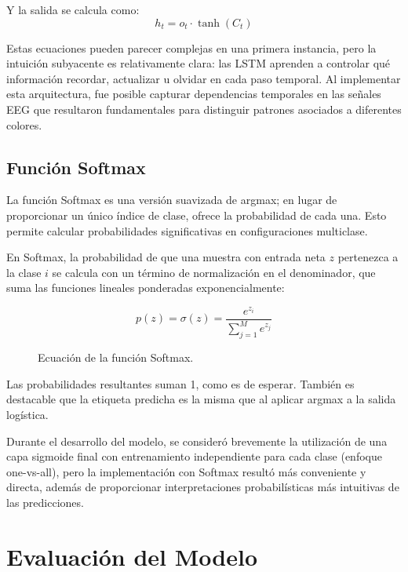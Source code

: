 Y la salida se calcula como:
\begin{equation}
    h_t = o_t \cdot \tanh(C_t)
\end{equation}

Estas ecuaciones pueden parecer complejas en una primera instancia, pero la intuición subyacente es relativamente clara: las LSTM aprenden a controlar qué información recordar, actualizar u olvidar en cada paso temporal. Al implementar esta arquitectura, fue posible capturar dependencias temporales en las señales EEG que resultaron fundamentales para distinguir patrones asociados a diferentes colores.

\subsection{Función Softmax}
La función Softmax es una versión suavizada de argmax; en lugar de proporcionar un único índice de clase, ofrece la probabilidad de cada una. Esto permite calcular probabilidades significativas en configuraciones multiclase.

En Softmax, la probabilidad de que una muestra con entrada neta $z$ pertenezca a la clase $i$ se calcula con un término de normalización en el denominador, que suma las funciones lineales ponderadas exponencialmente:

\begin{figure}[h!]
    \centering
    \begin{equation}
        p(z) = \sigma(z) = \frac{e^{z_i}}{\sum_{j=1}^M e^{z_j}}
    \end{equation}
    \caption{Ecuación de la función Softmax.}
    \label{fig:softmax_equation}
\end{figure}

Las probabilidades resultantes suman 1, como es de esperar. También es destacable que la etiqueta predicha es la misma que al aplicar argmax a la salida logística.

Durante el desarrollo del modelo, se consideró brevemente la utilización de una capa sigmoide final con entrenamiento independiente para cada clase (enfoque one-vs-all), pero la implementación con Softmax resultó más conveniente y directa, además de proporcionar interpretaciones probabilísticas más intuitivas de las predicciones.

\section{Evaluación del Modelo}

